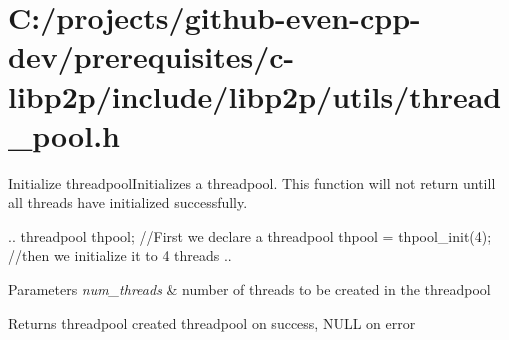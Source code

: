 \hypertarget{_c_1_2projects_2github-even-cpp-dev_2prerequisites_2c-libp2p_2include_2libp2p_2utils_2thread_pool_8h-example}{}\section{C\+:/projects/github-\/even-\/cpp-\/dev/prerequisites/c-\/libp2p/include/libp2p/utils/thread\+\_\+pool.\+h}
Initialize threadpool\+Initializes a threadpool. This function will not return untill all threads have initialized successfully.

.. threadpool thpool; //\+First we declare a threadpool thpool = thpool\+\_\+init(4); //then we initialize it to 4 threads ..


\begin{DoxyParams}{Parameters}
{\em num\+\_\+threads} & number of threads to be created in the threadpool \\
\hline
\end{DoxyParams}
\begin{DoxyReturn}{Returns}
threadpool created threadpool on success, N\+U\+LL on error
\end{DoxyReturn}

